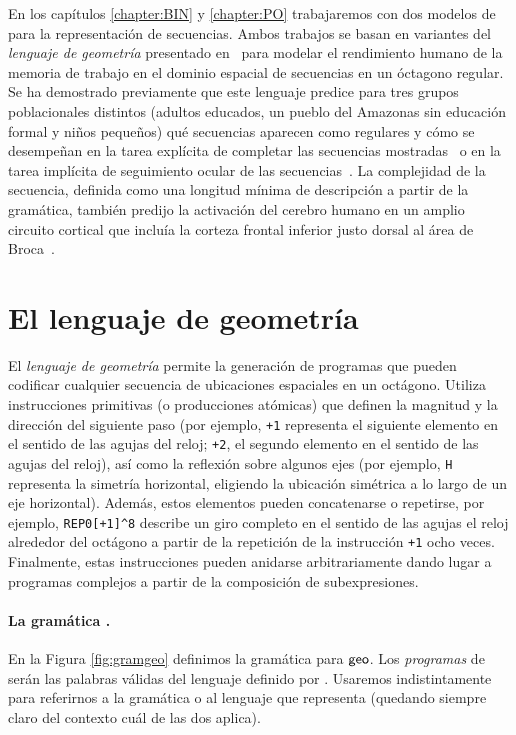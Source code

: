
En los capítulos \ref{chapter:BIN} y \ref{chapter:PO} trabajaremos con dos modelos de \lot para la representación de secuencias. Ambos trabajos se basan en variantes del \textit{lenguaje de geometría} presentado en~\cite{amalric2017language} para modelar el rendimiento humano de la memoria de trabajo en el dominio espacial de secuencias en un óctagono regular. Se ha demostrado previamente que este lenguaje predice para tres grupos poblacionales distintos (adultos educados, un pueblo del Amazonas sin educación formal y niños pequeños) qué secuencias aparecen como regulares y cómo se desempeñan en la tarea explícita de completar las secuencias mostradas~\cite{amalric2017language} o en la tarea implícita de seguimiento ocular de las secuencias~\cite{f60}. La complejidad de la secuencia, definida como una longitud mínima de descripción a partir de la gramática, también predijo la activación del cerebro humano en un amplio circuito cortical que incluía la corteza frontal inferior justo dorsal al área de Broca~\cite{f60}.

\section*{El lenguaje de geometría \gramgeo}

El \textit{lenguaje de geometría} permite la generación de programas que pueden codificar cualquier secuencia de ubicaciones espaciales en un octágono. Utiliza instrucciones primitivas (o producciones atómicas) que definen la magnitud y la dirección del siguiente paso (por ejemplo, \verb#+1# representa el siguiente elemento en el sentido de las agujas del reloj; \verb#+2#, el segundo elemento en el sentido de las agujas del reloj), así como la reflexión sobre algunos ejes (por ejemplo, \verb#H# representa la simetría horizontal, eligiendo la ubicación simétrica a lo largo de un eje horizontal). Además, estos elementos pueden concatenarse o repetirse, por ejemplo, \verb#REP0[+1]^8# describe un giro completo en el sentido de las agujas el reloj alrededor del octágono a partir de la repetición de la instrucción \verb#+1# ocho veces. Finalmente, estas instrucciones pueden anidarse arbitrariamente dando lugar a programas complejos a partir de la composición de subexpresiones.

\paragraph{La gramática \gramgeo.}
En la Figura \ref{fig:gramgeo} definimos la gramática para ${\sf geo}$. Los {\em programas} de \gramgeo serán las palabras válidas del lenguaje definido por \gramgeo. Usaremos indistintamente \gramgeo para referirnos a la gramática o al lenguaje que representa (quedando siempre claro del contexto cuál de las dos aplica).

